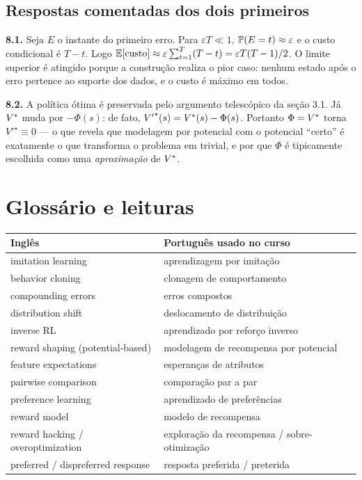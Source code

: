 \documentclass[11pt, a4paper]{article}
\begin{document}
\subsection*{Respostas comentadas dos dois primeiros}

\textbf{8.1.} Seja $E$ o instante do primeiro erro. Para $\varepsilon T\ll1$,
$\mathbb{P}(E=t)\approx\varepsilon$ e o custo condicional é $T-t$. Logo
$\mathbb{E}[\text{custo}] \approx \varepsilon\sum_{t=1}^{T}(T-t) = \varepsilon T(T-1)/2$.
O limite superior é atingido porque a construção realiza o pior caso: nenhum
estado após o erro pertence ao suporte dos dados, e o custo é máximo em todos.

\textbf{8.2.} A política ótima é preservada pelo argumento telescópico da
seção 3.1. Já $V^{*}$ muda por $-\Phi(s)$: de fato, ${V'}^{\star}(s) =
V^{*}(s) - \Phi(s)$. Portanto $\Phi = V^{*}$ torna ${V'}^{\star}\equiv0$ ---
o que revela que modelagem por potencial com o potencial ``certo'' é
exatamente o que transforma o problema em trivial, e por que $\Phi$ é
tipicamente escolhida como uma \emph{aproximação} de $V^{*}$.

\section{Glossário e leituras}

\begin{center}\small
\begin{tabular}{@{}ll@{}}
\toprule
\textbf{Inglês} & \textbf{Português usado no curso}\\
\midrule
imitation learning & aprendizagem por imitação\\
behavior cloning & clonagem de comportamento\\
compounding errors & erros compostos\\
distribution shift & deslocamento de distribuição\\
inverse RL & aprendizado por reforço inverso\\
reward shaping (potential-based) & modelagem de recompensa por potencial\\
feature expectations & esperanças de atributos\\
pairwise comparison & comparação par a par\\
preference learning & aprendizado de preferências\\
reward model & modelo de recompensa\\
reward hacking / overoptimization & exploração da recompensa / sobre-otimização\\
preferred / dispreferred response & resposta preferida / preterida\\
\bottomrule
\end{tabular}
\end{center}
\end{document}
